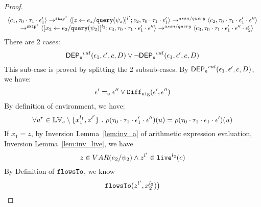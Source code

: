 {\begin{proof}
\begin{equation}
\label{eq:m1asn_inv2}
  \begin{array}{l}   
  \langle c_1, \mathtt{\tau}_0 \cdot \mathtt{\tau}_1 \cdot \mathtt{\epsilon}_1' \rangle 
  \rightarrow^{\mathtt{skip}^*} 
  \langle [\mathrel{ z \leftarrow e_z / {\tt query}(\psi_z) }]^{l'};{c}_2, 
  \mathtt{\tau}_0 \cdot \mathtt{\tau}_1 \cdot \mathtt{\epsilon}_1' \rangle 
  \rightarrow^{assn/query} 
  \langle {c}_2,  \mathtt{\tau}_0 \cdot \mathtt{\tau}_1 \cdot \mathtt{\epsilon}_1' \cdot \mathtt{\epsilon}'' \rangle  \\
  \qquad \rightarrow^{\mathtt{skip}^*} 
  \langle [\mathrel{ {x}_2 \leftarrow e_2 / {\tt query}(\psi_2) }]^{l_2};{c}_3, 
  \mathtt{\tau}_0 \cdot \mathtt{\tau}_1 \cdot \mathtt{\epsilon}_1' \cdot \mathtt{\epsilon}'' \rangle 
  \rightarrow^{assn/query} 
  \langle {c}_3,  \mathtt{\tau}_0 \cdot \mathtt{\tau}_1 \cdot \mathtt{\epsilon}_1' \cdot \mathtt{\epsilon}'' \cdot \mathtt{\epsilon}_2' \rangle 
\end{array}
 \end{equation}
 There are 2 cases:
%
\[
\mathsf{DEP_{\mathtt{e}}}^{val}(\mathtt{\epsilon}_1, \mathtt{\epsilon}', c, D) \lor \neg \mathsf{DEP_{\mathtt{e}}}^{val}(\mathtt{\epsilon}_1, \mathtt{\epsilon}', c, D)
\]
%
This sub-case is proved by splitting the 2 subsub-cases.
%
%
By $\mathsf{DEP_{\mathtt{e}}}^{val}(\mathtt{\epsilon}_1, \mathtt{\epsilon}', c, D)$, we have:
%
\[
  \mathtt{\epsilon}' =_{\mathtt{e}} \mathtt{\epsilon}'' \lor \mathtt{Diff}_{\mathtt{sig}}(\mathtt{\epsilon}', \mathtt{\epsilon}'')
\]
%
By definition of environment, we have:
\[
  \forall u^r \in \mathbb{LV}_c \setminus \{x_1^{l_1}, z^{l'}\} ~.~
  \rho(\mathtt{\tau}_0 \cdot \mathtt{\tau}_1 \cdot \mathtt{\epsilon}_1' \cdot \mathtt{\epsilon}'') (u) =  
  \rho(\mathtt{\tau}_0 \cdot \mathtt{\tau}_1 \cdot \mathtt{\epsilon}_1 \cdot \mathtt{\epsilon}') (u)
\]
%
If $x_1 = z$, by {Inversion Lemma~\ref{lem:inv_a}} of arithmetic expression evaluation, Inversion Lemma~\ref{lem:inv_live}, we have 
%
\[
  z \in VAR(e_2 / \psi_2)
  \land z^{l'}\in \mathtt{live}^{l_2}(c)
\]
%
By Definition of $\mathtt{flowsTo}$, we know
\[
  \mathtt{flowsTo}(z^{l'}, x_2^{l_2}) \big)
\]


\end{proof}}

